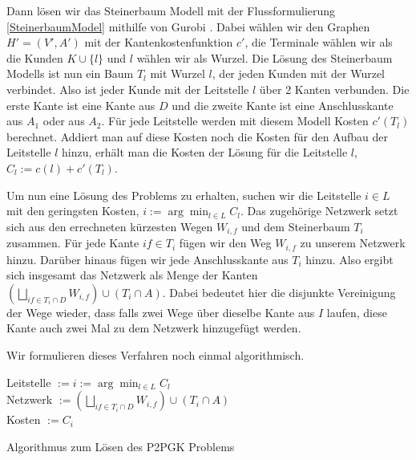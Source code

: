 \documentclass[11pt,a4paper]{article}
\theoremstyle{my_th_style1}
\begin{document}
Dann lösen wir das Steinerbaum Modell mit der Flussformulierung \eqref{SteinerbaumModel} mithilfe von Gurobi \cite{gurobi}.
Dabei wählen wir den Graphen $H'=(V',A')$ mit der Kantenkostenfunktion $c'$, die Terminale wählen wir als die Kunden $K \cup \{l\}$ und $l$ w\"ahlen wir als Wurzel. 
Die Lösung des Steinerbaum Modells ist nun ein Baum $T_l$ mit Wurzel $l$, der jeden Kunden mit der Wurzel verbindet. 
Also ist jeder Kunde mit der Leitstelle $l$ über 2 Kanten verbunden. Die erste Kante ist eine Kante aus $D$ und die zweite Kante ist eine Anschlusskante aus $A_1$ oder aus $A_2$. 
Für jede Leitstelle werden mit diesem Modell Kosten $c'(T_l)$ berechnet. 
Addiert man auf diese Kosten noch die Kosten für den Aufbau der Leitstelle $l$ hinzu, erhält man die Kosten der Lösung für die Leitstelle \(l\), $C_l:=c(l)+c'(T_l)$.

Um nun eine Lösung des Problems zu erhalten, suchen wir die Leitstelle $i \in L$ mit den geringsten Kosten, $i:=\arg \displaystyle\min_{l \in L} C_l$.
Das zugehörige Netzwerk setzt sich aus den errechneten kürzesten Wegen  $W_{i,f}$ und dem Steinerbaum $T_i$ zusammen.
Für jede Kante $if \in T_i$ fügen wir den Weg $W_{i,f}$ zu unserem Netzwerk hinzu.
Darüber hinaus fügen wir jede Anschlusskante aus $T_i$ hinzu. Also ergibt sich insgesamt das Netzwerk als Menge der Kanten $(\bigsqcup_{if \in T_i \cap D} W_{i,f}) \cup (T_i\cap A)$.
Dabei bedeutet hier die disjunkte Vereinigung der Wege wieder, dass falls zwei Wege \"uber dieselbe Kante aus \(I\) laufen, diese Kante auch zwei Mal zu dem Netzwerk hinzugef\"ugt werden.

Wir formulieren dieses Verfahren noch einmal algorithmisch.

\vspace{0.5cm}
\begin{algorithm}[H]
	\label{alg1}
\BlankLine

	Leitstelle $:=i:=\arg \displaystyle\min_{l \in L} C_l$\\
	Netzwerk $:=(\bigsqcup_{if \in T_i \cap D}W_{i,f}) \cup (T_i\cap A)$\\
	Kosten $:=C_{i}$
	\BlankLine
\caption{Algorithmus zum Lösen des P2PGK Problems}
\end{algorithm}
\vspace{0.5cm}
\end{document}
